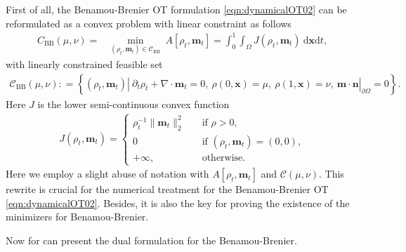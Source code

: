 \documentclass[11pt]{book}
\newcommand{\dx}{\mathrm{d}\mathbf{x}}
\newcommand{\dt}{\mathrm{d}t}
\begin{document}
First of all, the Benamou-Brenier OT formulation \eqref{eqn:dynamicalOT02} can be reformulated as a convex problem with linear constraint as follows
\begin{align}\label{eqn:dynamicalOT03}
    C_{\mathrm{BB}}(\mu,\nu) =  &\min_{(\rho_t,\mathbf{m}_t)\in\mathcal{C}_{\mathrm{BB}}}\  A[\rho_t, \mathbf{m}_t] = \int_0^1\int_{\Omega} J(\rho_t, \mathbf{m}_t) \ \dx\dt,
\end{align}
with linearly constrained feasible set
\begin{align}
    \mathcal{C}_{\mathrm{BB}}(\mu,\nu) : = \left\{ (\rho_t,\mathbf{m}_t) |\ \partial_t\rho_t + \nabla\cdot \mathbf{m}_t = 0,\ \rho(0,\mathbf{x})=\mu,\ \rho(1,\mathbf{x})=\nu,\ \mathbf{m}\cdot \mathbf{n}|_{\partial \Omega} = 0  \right\}.
\end{align}
Here $J$ is the lower semi-continuous convex function
\begin{align}\label{eqn:J_definition02}
  J(\rho_t,\mathbf{m}_t) = 
  \begin{cases}
    \rho_t^{-1}\|\mathbf{m}_t\|_2^2 \quad &\text{if\ } \rho >0, \\
    0 \quad &\text{if\ } (\rho_t, \mathbf{m}_t) = (0,0), \\
    +\infty, \quad & \text{otherwise}.
  \end{cases}
\end{align}
Here we employ a slight abuse of notation with $A[\rho_t,\mathbf{m}_t]$ and $\mathcal{C}(\mu,\nu)$. This rewrite is crucial for the numerical treatment for the Benamou-Brenier OT \eqref{eqn:dynamicalOT02}. Besides, it is also the key for proving the existence of the minimizers for Benamou-Brenier.

Now for can present the dual formulation for the Benamou-Brenier.
\end{document}
